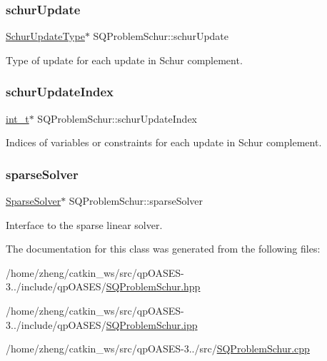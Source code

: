 \subsubsection{\texorpdfstring{schur\+Update}{schurUpdate}}
{\footnotesize\ttfamily \hyperlink{_types_8hpp_ab47fe4250d4805d1f5e357f55c65a4c6}{Schur\+Update\+Type}$\ast$ S\+Q\+Problem\+Schur\+::schur\+Update\hspace{0.3cm}{\ttfamily [protected]}}

Type of update for each update in Schur complement. \mbox{\label{class_s_q_problem_schur_a19b9f18a99513793542bc53524951c94}} 
\subsubsection{\texorpdfstring{schur\+Update\+Index}{schurUpdateIndex}}
{\footnotesize\ttfamily \hyperlink{_types_8hpp_ab6fd6105e64ed14a0c9281326f05e623}{int\+\_\+t}$\ast$ S\+Q\+Problem\+Schur\+::schur\+Update\+Index\hspace{0.3cm}{\ttfamily [protected]}}

Indices of variables or constraints for each update in Schur complement. \mbox{\label{class_s_q_problem_schur_a55de6d4c9cca036018d0d86fe47e7716}} 
\subsubsection{\texorpdfstring{sparse\+Solver}{sparseSolver}}
{\footnotesize\ttfamily \hyperlink{class_sparse_solver}{Sparse\+Solver}$\ast$ S\+Q\+Problem\+Schur\+::sparse\+Solver\hspace{0.3cm}{\ttfamily [protected]}}

Interface to the sparse linear solver. 

The documentation for this class was generated from the following files\+:\begin{DoxyCompactItemize}
\item 
/home/zheng/catkin\+\_\+ws/src/qp\+O\+A\+S\+E\+S-\/3../include/qp\+O\+A\+S\+E\+S/\hyperlink{_s_q_problem_schur_8hpp}{S\+Q\+Problem\+Schur.\+hpp}\item 
/home/zheng/catkin\+\_\+ws/src/qp\+O\+A\+S\+E\+S-\/3../include/qp\+O\+A\+S\+E\+S/\hyperlink{_s_q_problem_schur_8ipp}{S\+Q\+Problem\+Schur.\+ipp}\item 
/home/zheng/catkin\+\_\+ws/src/qp\+O\+A\+S\+E\+S-\/3../src/\hyperlink{_s_q_problem_schur_8cpp}{S\+Q\+Problem\+Schur.\+cpp}\end{DoxyCompactItemize}
